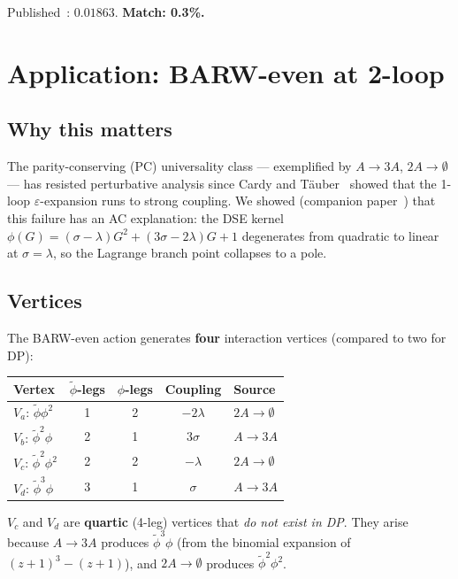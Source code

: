 \documentclass[11pt,a4paper]{article}
\theoremstyle{definition}
\newcommand{\phit}{\tilde\phi}
\begin{document}
Published~\cite{adzhemyan2023}: $0.01863$.
\textbf{Match: 0.3\%.}


\section{Application: BARW-even at 2-loop}
\label{sec:barw}

\subsection{Why this matters}

The parity-conserving (PC) universality class --- exemplified by
$A \to 3A$, $2A \to \emptyset$ --- has resisted perturbative
analysis since Cardy and T\"auber~\cite{cardytauber1996} showed
that the 1-loop $\varepsilon$-expansion runs to strong coupling.
We showed (companion paper~\cite{amarteifio2026rdft}) that this
failure has an AC explanation: the DSE kernel
$\phi(G) = (\sigma{-}\lambda)G^2 + (3\sigma{-}2\lambda)G + 1$
degenerates from quadratic to linear at $\sigma = \lambda$, so
the Lagrange branch point collapses to a pole.

\subsection{Vertices}

The BARW-even action generates \textbf{four} interaction vertices
(compared to two for DP):

\begin{center}
\renewcommand{\arraystretch}{1.2}
\begin{tabular}{lcccl}
\toprule
Vertex & $\phit$-legs & $\phi$-legs & Coupling & Source \\
\midrule
$V_a$: $\phit\phi^2$ & 1 & 2 & $-2\lambda$ & $2A \to \emptyset$ \\
$V_b$: $\phit^2\phi$ & 2 & 1 & $3\sigma$ & $A \to 3A$ \\
$V_c$: $\phit^2\phi^2$ & 2 & 2 & $-\lambda$ & $2A \to \emptyset$ \\
$V_d$: $\phit^3\phi$ & 3 & 1 & $\sigma$ & $A \to 3A$ \\
\bottomrule
\end{tabular}
\end{center}

$V_c$ and $V_d$ are \textbf{quartic} (4-leg) vertices that
\emph{do not exist in DP}. They arise because $A \to 3A$ produces
$\phit^3\phi$ (from the binomial expansion of $(z{+}1)^3 - (z{+}1)$),
and $2A \to \emptyset$ produces $\phit^2\phi^2$.
\end{document}
